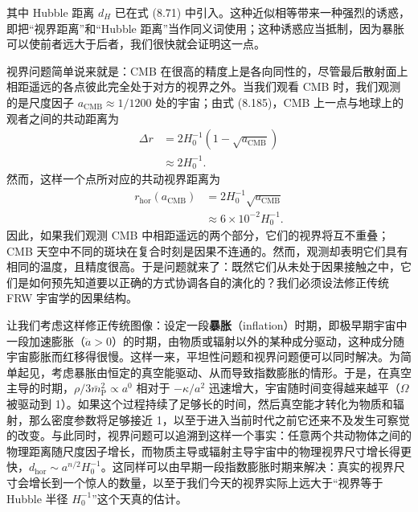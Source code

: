 其中 Hubble 距离 $d_{H}$ 已在式 (8.71) 中引入。这种近似相等带来一种强烈的诱惑，即把“视界距离”和“Hubble 距离”当作同义词使用；这种诱惑应当抵制，因为暴胀可以使前者远大于后者，我们很快就会证明这一点。

视界问题简单说来就是：CMB 在很高的精度上是各向同性的，尽管最后散射面上相距遥远的各点彼此完全处于对方的视界之外。当我们观看 CMB 时，我们观测的是尺度因子 $a_{\mathrm{CMB}}\approx 1/1200$ 处的宇宙；由式 (8.185)，CMB 上一点与地球上的观者之间的共动距离为
\begin{equation*}
\begin{aligned}
\Delta r &= 2H_{0}^{-1}\left(1-\sqrt{a_{\mathrm{CMB}}}\right) \\
&\approx 2H_{0}^{-1}.
\end{aligned}
\tag{8.189}
\end{equation*}
然而，这样一个点所对应的共动视界距离为
\begin{equation*}
\begin{aligned}
r_{\mathrm{hor}}(a_{\mathrm{CMB}}) &= 2H_{0}^{-1}\sqrt{a_{\mathrm{CMB}}} \\
&\approx 6\times 10^{-2}H_{0}^{-1}.
\end{aligned}
\tag{8.190}
\end{equation*}
因此，如果我们观测 CMB 中相距遥远的两个部分，它们的视界将互不重叠；CMB 天空中不同的斑块在复合时刻是因果不连通的。然而，观测却表明它们具有相同的温度，且精度很高。于是问题就来了：既然它们从未处于因果接触之中，它们是如何预先知道要以正确的方式协调各自的演化的？我们必须设法修正传统 FRW 宇宙学的因果结构。

让我们考虑这样修正传统图像：设定一段\textbf{暴胀}（inflation）时期，即极早期宇宙中一段加速膨胀（$\ddot{a}>0$）的时期，由物质或辐射以外的某种成分驱动，这种成分随宇宙膨胀而红移得很慢。这样一来，平坦性问题和视界问题便可以同时解决。为简单起见，考虑暴胀由恒定的真空能驱动、从而导致指数膨胀的情形。于是，在真空主导的时期，$\rho/3\bar{m}_{\mathrm{P}}^{2}\propto a^{0}$ 相对于 $-\kappa/a^{2}$ 迅速增大，宇宙随时间变得越来越平（$\Omega$ 被驱动到 1）。如果这个过程持续了足够长的时间，然后真空能才转化为物质和辐射，那么密度参数将足够接近 1，以至于进入当前时代之前它还来不及发生可察觉的改变。与此同时，视界问题可以追溯到这样一个事实：任意两个共动物体之间的物理距离随尺度因子增长，而物质主导或辐射主导宇宙中的物理视界尺寸增长得更快，$d_{\mathrm{hor}}\sim a^{n/2}H_{0}^{-1}$。这同样可以由早期一段指数膨胀时期来解决：真实的视界尺寸会增长到一个惊人的数量，以至于我们今天的视界实际上远大于“视界等于 Hubble 半径 $H_{0}^{-1}$”这个天真的估计。

